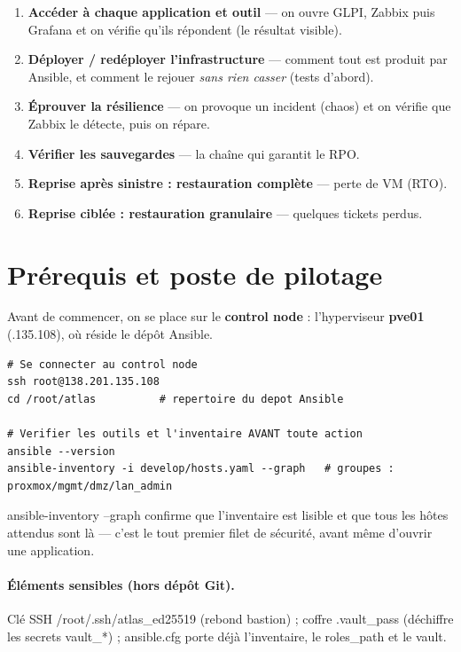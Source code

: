 \documentclass[11pt,a4paper]{article}
\newcommand{\cmd}[1]{{\ttfamily #1}}
\begin{document}
\begin{enumerate}[leftmargin=1.6em,label=\textbf{Étape \arabic*.}]
  \item \textbf{Accéder à chaque application et outil} — on ouvre GLPI, Zabbix puis
        Grafana et on vérifie qu'ils répondent (le résultat visible).
  \item \textbf{Déployer / redéployer l'infrastructure} — comment tout est produit par
        Ansible, et comment le rejouer \emph{sans rien casser} (tests d'abord).
  \item \textbf{Éprouver la résilience} — on provoque un incident (chaos) et on vérifie
        que Zabbix le détecte, puis on répare.
  \item \textbf{Vérifier les sauvegardes} — la chaîne qui garantit le RPO.
  \item \textbf{Reprise après sinistre : restauration complète} — perte de VM (RTO).
  \item \textbf{Reprise ciblée : restauration granulaire} — quelques tickets perdus.
\end{enumerate}

\section{Prérequis et poste de pilotage}

Avant de commencer, on se place sur le \textbf{control node} : l'hyperviseur
\textbf{pve01} (\cmd{138.201.135.108}), où réside le dépôt Ansible.

\begin{lstlisting}[style=bash]
# Se connecter au control node
ssh root@138.201.135.108
cd /root/atlas          # repertoire du depot Ansible

# Verifier les outils et l'inventaire AVANT toute action
ansible --version
ansible-inventory -i develop/hosts.yaml --graph   # groupes : proxmox/mgmt/dmz/lan_admin
\end{lstlisting}

\begin{astuce}
\cmd{ansible-inventory --graph} confirme que l'inventaire est lisible et que tous les
hôtes attendus sont là — c'est le tout premier filet de sécurité, avant même d'ouvrir
une application.
\end{astuce}

\paragraph{Éléments sensibles (hors dépôt Git).} Clé SSH \cmd{/root/.ssh/atlas_ed25519}
(rebond bastion) ; coffre \cmd{.vault_pass} (déchiffre les secrets \cmd{vault\_*}) ;
\cmd{ansible.cfg} porte déjà l'inventaire, le \cmd{roles_path} et le vault.
\end{document}
